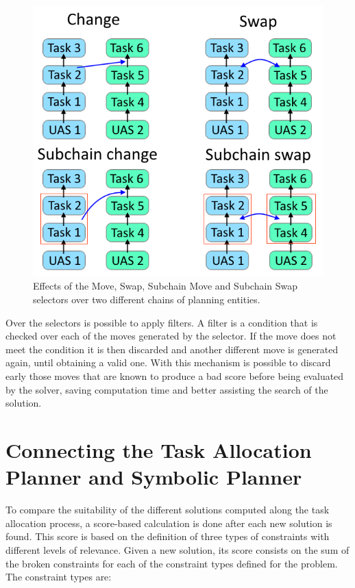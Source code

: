 \documentclass[runningheads,a4paper]{llncs}
\begin{document}
	\begin{figure}
    		\centering
    		\includegraphics[width=0.4\columnwidth]{moves.png}
    		\caption[Effects of the Move, Swap, Subchain Move and Subchain Swap selectors.]{Effects of the Move, Swap, Subchain Move and Subchain Swap selectors over two different chains of planning entities.}
    		\label{fig:moves}
	\end{figure}
	
Over the selectors is possible to apply filters. A filter is a condition that is checked over each of the moves generated by the selector. If the move does not meet the condition it is then discarded and another different move is generated again, until obtaining a valid one. With this mechanism is possible to discard early those moves that are known to produce a bad score before being evaluated by the solver, saving computation time and better assisting the search of the solution.

\section{Connecting the Task Allocation Planner and Symbolic Planner}
    \label{sec:score_calc}

To compare the suitability of the different solutions computed along the task allocation process, a score-based calculation is done after each new solution is found. This score is based on the definition of three types of constraints with different levels of relevance. Given a new solution, its score consists on the sum of the broken constraints for each of the constraint types defined for the problem. The constraint types are:
\end{document}
